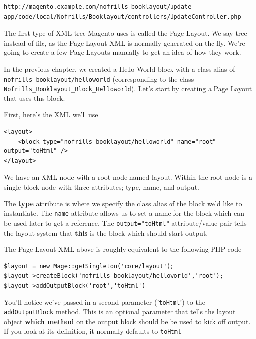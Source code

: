 \documentclass[oneside]{book}
\begin{document}
\begin{lstlisting}
http://magento.example.com/nofrills_booklayout/update
app/code/local/Nofrills/Booklayout/controllers/UpdateController.php

\end{lstlisting}


The first type of XML tree Magento uses is called the Page Layout.  We say tree instead of file, as the Page Layout XML is normally generated on the fly.  We're going to create a few Page Layouts manually to get an idea of how they work.

In the previous chapter, we created a Hello World block with a class alias of \footnotesize\texttt{nofrills\_booklayout/helloworld} \normalsize  (corresponding to the class \footnotesize\texttt{Nofrills\_Booklayout\_Block\_Helloworld}\normalsize).  Let's start by creating a Page Layout that uses this block.

First, here's the XML we'll use

\begin{lstlisting}
<layout>
    <block type="nofrills_booklayout/helloworld" name="root" output="toHtml" />
</layout>

\end{lstlisting}


We have an XML node with a root node named layout.  Within the root node is a single block node with three attributes; type, name, and output.

The \textbf{type} attribute is where we specify the class alias of the block we'd like to instantiate.  The \footnotesize\texttt{name} \normalsize  attribute allows us to set a name for the block which can be used later to get a reference.  The \footnotesize\texttt{output="toHtml"} \normalsize  attribute/value pair tells the layout system that \textbf{this} is the block which should start output.

The Page Layout XML above is roughly equivalent to the following PHP code

\begin{lstlisting}
$layout = new Mage::getSingleton('core/layout');
$layout->createBlock('nofrills_booklayout/helloworld','root');
$layout->addOutputBlock('root','toHtml')

\end{lstlisting}


You'll notice we've passed in a second parameter ('\footnotesize\texttt{toHtml}\normalsize') to the \footnotesize\texttt{addOutputBlock} \normalsize  method.  This is an optional parameter that tells the layout object \textbf{which method} on the output block should be be used to kick off output.  If you look at its definition, it normally defaults to \footnotesize\texttt{toHtml} \normalsize
\end{document}
